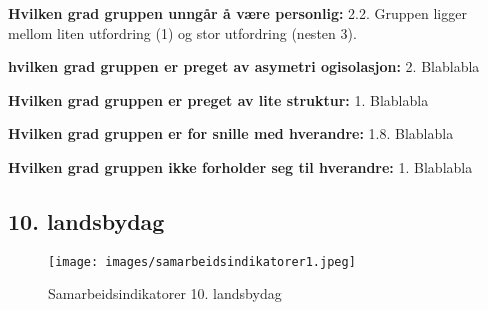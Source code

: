 \noindent \textbf{Hvilken grad gruppen unngår å være personlig:} 2.2.
\newline
\noindent Gruppen ligger mellom liten utfordring (1) og stor utfordring (nesten 3).
\vspace{\secspace}

\noindent \textbf{hvilken grad gruppen er preget av asymetri ogisolasjon:} 2.
\newline
\noindent Blablabla
\vspace{\secspace}

\noindent \textbf{Hvilken grad gruppen er preget av lite struktur:} 1.
\newline
\noindent Blablabla
\vspace{\secspace}

\noindent \textbf{Hvilken grad gruppen er for snille med hverandre:} 1.8.
\newline
\noindent Blablabla
\vspace{\secspace}

\noindent \textbf{Hvilken grad gruppen ikke forholder seg til hverandre:} 1.
\newline
\noindent Blablabla

\subsection{10. landsbydag}
\begin{figure}[H]
    \centering
    \texttt{[image: images/samarbeidsindikatorer1.jpeg]}	
    \caption{Samarbeidsindikatorer 10. landsbydag}
    \label{fig:sam2}
\end{figure}
